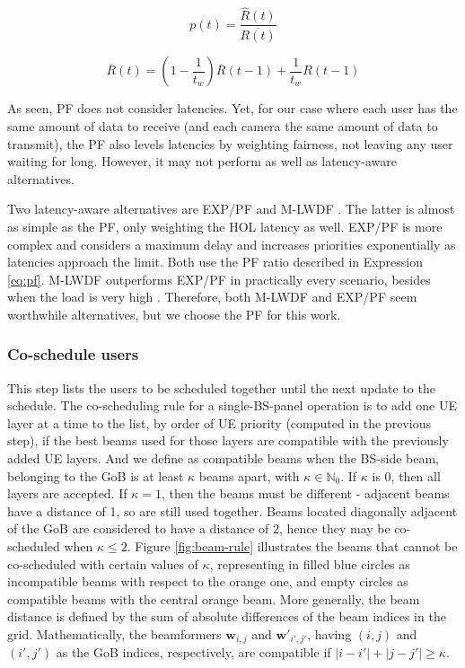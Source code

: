 \begin{equation} \label{eq:pf}
    p(t) = \frac{\hat{R}(t)}{\overline{R(t)}}
\end{equation}

\begin{equation} \label{eq:pf2}
    \overline{R}(t) = \left( 1 - \frac{1}{t_w} \right) \overline{R} (t-1) + \frac{1}{t_w} R(t-1)
\end{equation}

As seen, PF does not consider latencies. Yet, for our case where each user has the same amount of data to receive (and each camera the same amount of data to transmit), the PF also levels latencies by weighting fairness, not leaving any user waiting for long. However, it may not perform as well as latency-aware alternatives.

Two latency-aware alternatives are \ac{EXP/PF} \cite{exp_algorithm} and \ac{M-LWDF} \cite{scheduler_performance_eval}. The latter is almost as simple as the PF, only weighting the \ac{HOL} latency as well. \ac{EXP/PF} is more complex and considers a maximum delay and increases priorities exponentially as latencies approach the limit. Both use the PF ratio described in Expression \eqref{eq:pf}. \ac{M-LWDF} outperforms \ac{EXP/PF} in practically every scenario, besides when the load is very high \cite{scheduler_performance_eval} \cite{5340336}. Therefore, both \ac{M-LWDF} and \ac{EXP/PF} seem worthwhile alternatives, but we choose the PF for this work.

\subsubsection*{Co-schedule users}
This step lists the users to be scheduled together until the next update to the schedule. The co-scheduling rule for a single-BS-panel operation is to add one UE layer at a time to the list, by order of \ac{UE} priority (computed in the previous step), if the best beams used for those layers are compatible with the previously added \ac{UE} layers. And we define as compatible beams when the BS-side beam, belonging to the \ac{GoB} is at least $\kappa$ beams apart, with $\kappa \in \mathbb{N}_0$. If $\kappa$ is 0, then all layers are accepted. If $\kappa = 1$, then the beams must be different - adjacent beams have a distance of 1, so are still used together. Beams located diagonally adjacent of the \ac{GoB} are considered to have a distance of 2, hence they may be co-scheduled when $\kappa \leq 2$. Figure \ref{fig:beam-rule} illustrates the beams that cannot be co-scheduled with certain values of $\kappa$, representing in filled blue circles as incompatible beams with respect to the orange one, and empty circles as compatible beams with the central orange beam. More generally, the beam distance is defined by the sum of absolute differences of the beam indices in the grid. Mathematically, the beamformers $\bm{w}_{i,j}$ and $\bm{w}'_{i',j'}$, having $(i,j)$ and $(i', j')$ as the GoB indices, respectively, are compatible if $|i-i'| + |j - j'| \geq \kappa$.
    
